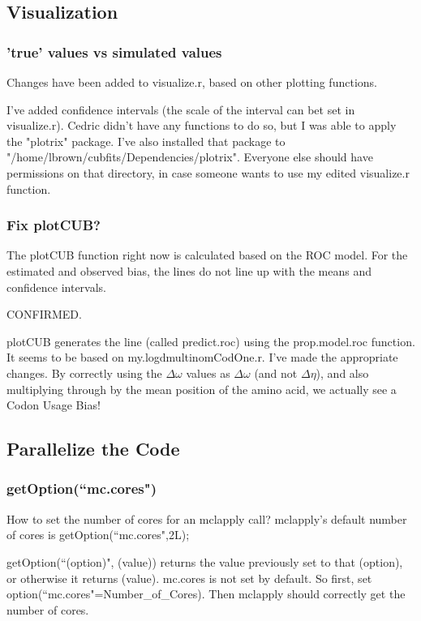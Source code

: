 \subsection{Visualization}

\subsubsection{'true' values vs simulated values}

Changes have been added to visualize.r, based on other plotting functions.

I've added confidence intervals (the scale of the interval can bet set in visualize.r). Cedric didn't have any functions to do so, but I was able to apply the "plotrix" package. I've also installed that package to "/home/lbrown/cubfits/Dependencies/plotrix". Everyone else should have permissions on that directory, in case someone wants to use my edited visualize.r function.


\subsubsection{Fix plotCUB?}

The plotCUB function right now is calculated based on the ROC model. For the estimated and observed bias, the lines do not line up with the means and confidence intervals.

CONFIRMED.

plotCUB generates the line (called predict.roc) using the prop.model.roc function. It seems to be based on my.logdmultinomCodOne.r. I've made the appropriate changes. By correctly using the $\Delta\omega$ values as $\Delta\omega$ (and not $\Delta\eta$), and also multiplying through by the mean position of the amino acid, we actually see a Codon Usage Bias!


\subsection{Parallelize the Code}

\subsubsection{getOption(``mc.cores")}
How to set the number of cores for an mclapply call? mclapply's default number of cores is getOption(``mc.cores",2L);

getOption(``(option)", (value)) returns the value previously set to that (option), or otherwise it returns (value). mc.cores is not set by default. So first, set option(``mc.cores"=Number\_of\_Cores). Then mclapply should correctly get the number of cores.

